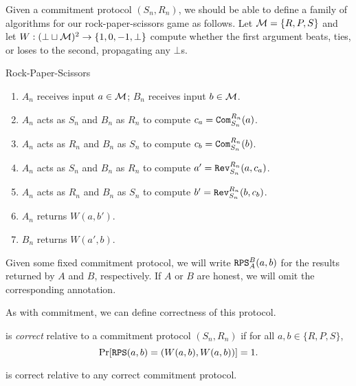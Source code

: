 \noindent
Given a commitment protocol $(S_n,R_n)$, we should be able to define a family of
algorithms for our rock-paper-scissors game as follows. Let $\mathcal{M} = \{R,P,S\}$
and let $W: (\bot\sqcup\mathcal{M})^2\rightarrow\{1,0,-1,\bot\}$ compute whether the
first argument beats, ties, or loses to the second, propagating any $\bot$s.

\begin{prot}{Rock-Paper-Scissors}\label{prot:rock-paper-scissors}
	\begin{enumerate}[itemsep=-0.2em]
		\item $A_n$ receives input $a\in\mathcal{M}$; $B_n$ receives input $b\in\mathcal{M}$.
		\item $A_n$ acts as $S_n$ and $B_n$ as $R_n$ to compute $c_a = {\texttt{Com}}_{S_n}^{R_n}(a)$.
		\item $A_n$ acts as $R_n$ and $B_n$ as $S_n$ to compute $c_b = {\texttt{Com}}_{S_n}^{R_n}(b)$.
		\item $A_n$ acts as $S_n$ and $B_n$ as $R_n$ to compute $a' = {\texttt{Rev}}_{S_n}^{R_n}(a,c_a)$.
		\item $A_n$ acts as $R_n$ and $B_n$ as $S_n$ to compute $b' = {\texttt{Rev}}_{S_n}^{R_n}(b,c_b)$.
		\item $A_n$ returns $W(a,b')$.
		\item $B_n$ returns $W(a',b)$.
	\end{enumerate}
\end{prot}

\begin{ntn}
	Given some fixed commitment protocol, we will write
	${\texttt{RPS}}_{A}^{B}(a,b)$ for the results returned by $A$ and $B$,
	respectively. If $A$ or $B$ are honest, we will omit the corresponding
	annotation.
\end{ntn}

\noindent
As with commitment, we can define correctness of this protocol.
\begin{dfn}
	 is \emph{correct} relative to a commitment
	protocol $(S_n,R_n)$ if for all $a,b\in\{R,P,S\}$,
	\[
		\Pr[{\texttt{RPS}}(a, b) = (W(a,b), W(a,b))] = 1.
	\]
\end{dfn}

\begin{prop}
	 is correct relative to any correct commitment
	protocol.
\end{prop}

